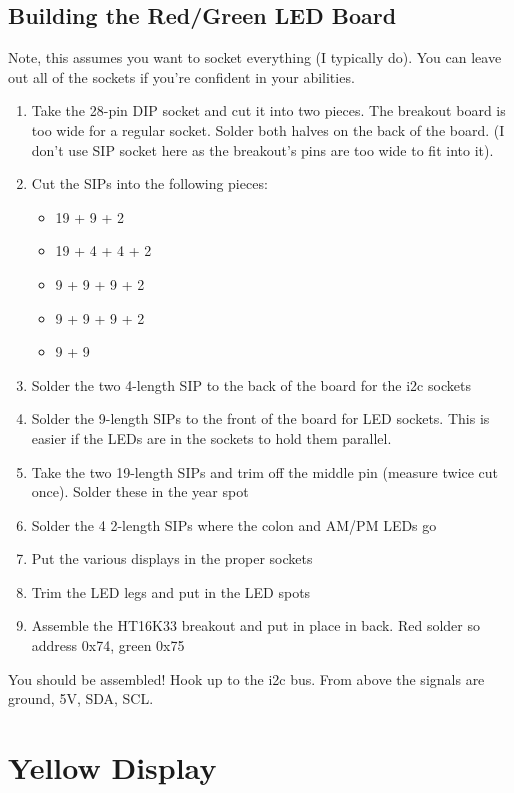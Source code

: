 \documentclass[11pt]{article}
\begin{document}
\subsection{Building the Red/Green LED Board}

Note, this assumes you want to socket everything (I typically do).
You can leave out all of the sockets if you're confident in your
abilities.

\begin{enumerate}
\item Take the 28-pin DIP socket and cut it into two pieces.
      The breakout board is too wide for a regular socket.
      Solder both halves on the back of the board.
      (I don't use SIP socket here as the breakout's pins are too
       wide to fit into it).
\item Cut the SIPs into the following pieces:
\begin{itemize}
\item 19 + 9 + 2
\item 19 + 4 + 4 + 2
\item 9 + 9 + 9 + 2
\item 9 + 9 + 9 + 2
\item 9 + 9
\end{itemize}
\item Solder the two 4-length SIP to the back of the board
      for the i2c sockets
\item Solder the 9-length SIPs to the front of the board for LED
      sockets.  This is easier if the LEDs are in the sockets to
      hold them parallel.
\item Take the two 19-length SIPs and trim off the middle pin
      (measure twice cut once).  Solder these in the year spot
\item Solder the 4 2-length SIPs where the colon and AM/PM LEDs go
\item Put the various displays in the proper sockets
\item Trim the LED legs and put in the LED spots
\item Assemble the HT16K33 breakout and put in place in back.
	Red solder so address 0x74, green 0x75
\end{enumerate}

You should be assembled!  Hook up to the i2c bus.  From above
the signals are ground, 5V, SDA, SCL.



\section{Yellow Display}
\end{document}
